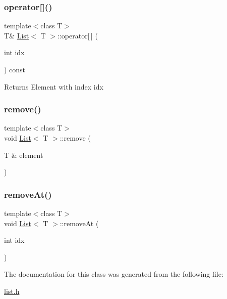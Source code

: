 \subsubsection{\texorpdfstring{operator[]()}{operator[]()}}
{\footnotesize\ttfamily template$<$class T$>$ \\
T\& \hyperlink{class_list}{List}$<$ T $>$\+::operator\mbox{[}$\,$\mbox{]} (\begin{DoxyParamCaption}\item[{int}]{idx }\end{DoxyParamCaption}) const\hspace{0.3cm}{\ttfamily [inline]}}

\begin{DoxyReturn}{Returns}
Element with index \textquotesingle{}idx\textquotesingle{} 
\end{DoxyReturn}
\mbox{\label{class_list_ab20b18c4facb9c8ab89640c202057b80}} 
\subsubsection{\texorpdfstring{remove()}{remove()}}
{\footnotesize\ttfamily template$<$class T$>$ \\
void \hyperlink{class_list}{List}$<$ T $>$\+::remove (\begin{DoxyParamCaption}\item[{T \&}]{element }\end{DoxyParamCaption})\hspace{0.3cm}{\ttfamily [inline]}}

\mbox{\label{class_list_a54fa90e725d350cd7bd41270ebdfe775}} 
\subsubsection{\texorpdfstring{remove\+At()}{removeAt()}}
{\footnotesize\ttfamily template$<$class T$>$ \\
void \hyperlink{class_list}{List}$<$ T $>$\+::remove\+At (\begin{DoxyParamCaption}\item[{int}]{idx }\end{DoxyParamCaption})\hspace{0.3cm}{\ttfamily [inline]}}



The documentation for this class was generated from the following file\+:\begin{DoxyCompactItemize}
\item 
\hyperlink{list_8h}{list.\+h}\end{DoxyCompactItemize}
